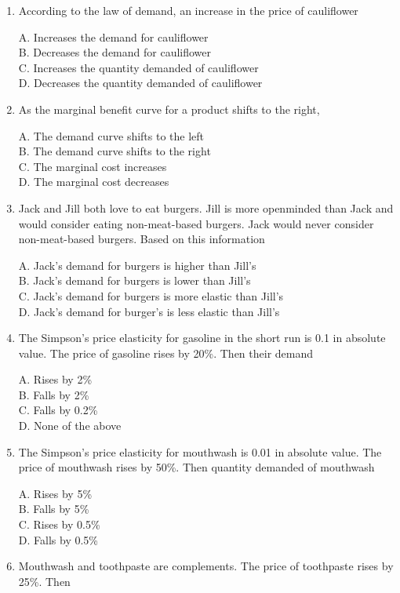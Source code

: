 \documentclass[
]{book}
\begin{document}
\begin{enumerate}
\def\labelenumi{\arabic{enumi}.}
\item
  According to the law of demand, an increase in the price of cauliflower

  A. Increases the demand for cauliflower\\
  B. Decreases the demand for cauliflower\\
  C. Increases the quantity demanded of cauliflower\\
  D. Decreases the quantity demanded of cauliflower
\item
  As the marginal benefit curve for a product shifts to the right,

  A. The demand curve shifts to the left\\
  B. The demand curve shifts to the right\\
  C. The marginal cost increases\\
  D. The marginal cost decreases
\item
  Jack and Jill both love to eat burgers. Jill is more openminded than Jack and would consider eating non-meat-based burgers. Jack would never consider non-meat-based burgers. Based on this information

  A. Jack's demand for burgers is higher than Jill's\\
  B. Jack's demand for burgers is lower than Jill's\\
  C. Jack's demand for burgers is more elastic than Jill's\\
  D. Jack's demand for burger's is less elastic than Jill's
\item
  The Simpson's price elasticity for gasoline in the short run is 0.1 in absolute value. The price of gasoline rises by 20\%. Then their demand

  A. Rises by 2\%\\
  B. Falls by 2\%\\
  C. Falls by 0.2\%\\
  D. None of the above
\item
  The Simpson's price elasticity for mouthwash is 0.01 in absolute value. The price of mouthwash rises by 50\%. Then quantity demanded of mouthwash

  A. Rises by 5\%\\
  B. Falls by 5\%\\
  C. Rises by 0.5\%\\
  D. Falls by 0.5\%
\item
  Mouthwash and toothpaste are complements. The price of toothpaste rises by 25\%. Then


\end{enumerate}
\end{document}
